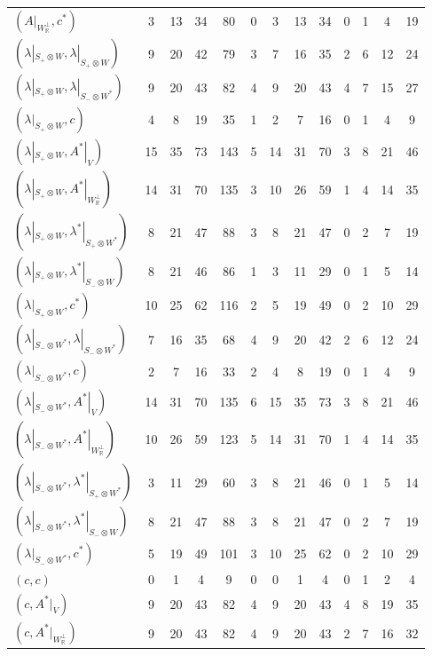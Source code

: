 \begin{tabular}{l|cccc|cccc|cccc}
$(A|_{W_{\mathbb R}^\perp},c^*)$ & 3 & 13 & 34 & 80 & 0 & 3 & 13 & 34 & 0 & 1 & 4 & 19\\
$(\lambda|_{S_+\otimes W},\lambda|_{S_+\otimes W})$ & 9 & 20 & 42 & 79 & 3 & 7 & 16 & 35 & 2 & 6 & 12 & 24\\
$(\lambda|_{S_+\otimes W},\lambda|_{S_-\otimes W^*})$ & 9 & 20 & 43 & 82 & 4 & 9 & 20 & 43 & 4 & 7 & 15 & 27\\
$(\lambda|_{S_+\otimes W},c)$ & 4 & 8 & 19 & 35 & 1 & 2 & 7 & 16 & 0 & 1 & 4 & 9\\
$(\lambda|_{S_+\otimes W},A^*|_V)$ & 15 & 35 & 73 & 143 & 5 & 14 & 31 & 70 & 3 & 8 & 21 & 46\\
$(\lambda|_{S_+\otimes W},A^*|_{W_{\mathbb R}^\perp})$ & 14 & 31 & 70 & 135 & 3 & 10 & 26 & 59 & 1 & 4 & 14 & 35\\
$(\lambda|_{S_+\otimes W},\lambda^*|_{S_+\otimes W^*})$ & 8 & 21 & 47 & 88 & 3 & 8 & 21 & 47 & 0 & 2 & 7 & 19\\
$(\lambda|_{S_+\otimes W},\lambda^*|_{S_-\otimes W})$ & 8 & 21 & 46 & 86 & 1 & 3 & 11 & 29 & 0 & 1 & 5 & 14\\
$(\lambda|_{S_+\otimes W},c^*)$ & 10 & 25 & 62 & 116 & 2 & 5 & 19 & 49 & 0 & 2 & 10 & 29\\
$(\lambda|_{S_-\otimes W^*},\lambda|_{S_-\otimes W^*})$ & 7 & 16 & 35 & 68 & 4 & 9 & 20 & 42 & 2 & 6 & 12 & 24\\
$(\lambda|_{S_-\otimes W^*},c)$ & 2 & 7 & 16 & 33 & 2 & 4 & 8 & 19 & 0 & 1 & 4 & 9\\
$(\lambda|_{S_-\otimes W^*},A^*|_V)$ & 14 & 31 & 70 & 135 & 6 & 15 & 35 & 73 & 3 & 8 & 21 & 46\\
$(\lambda|_{S_-\otimes W^*},A^*|_{W_{\mathbb R}^\perp})$ & 10 & 26 & 59 & 123 & 5 & 14 & 31 & 70 & 1 & 4 & 14 & 35\\
$(\lambda|_{S_-\otimes W^*},\lambda^*|_{S_+\otimes W^*})$ & 3 & 11 & 29 & 60 & 3 & 8 & 21 & 46 & 0 & 1 & 5 & 14\\
$(\lambda|_{S_-\otimes W^*},\lambda^*|_{S_-\otimes W})$ & 8 & 21 & 47 & 88 & 3 & 8 & 21 & 47 & 0 & 2 & 7 & 19\\
$(\lambda|_{S_-\otimes W^*},c^*)$ & 5 & 19 & 49 & 101 & 3 & 10 & 25 & 62 & 0 & 2 & 10 & 29\\
$(c,c)$ & 0 & 1 & 4 & 9 & 0 & 0 & 1 & 4 & 0 & 1 & 2 & 4\\
$(c,A^*|_V)$ & 9 & 20 & 43 & 82 & 4 & 9 & 20 & 43 & 4 & 8 & 19 & 35\\
$(c,A^*|_{W_{\mathbb R}^\perp})$ & 9 & 20 & 43 & 82 & 4 & 9 & 20 & 43 & 2 & 7 & 16 & 32\\

\end{tabular}
